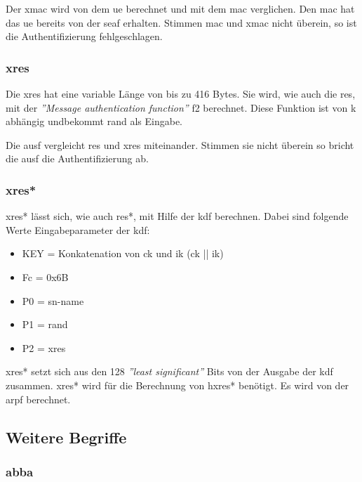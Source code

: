 Der \gls{xmac} wird von dem \gls{ue} berechnet und mit dem \gls{mac} verglichen. 
Den \gls{mac} hat das \gls{ue} bereits von der \gls{seaf} erhalten.
Stimmen \gls{mac} und \gls{xmac} nicht \"uberein, so ist die Authentifizierung fehlgeschlagen. %

\subsubsection{\gls{xres}}
Die \gls{xres} hat eine variable L\"ange von bis zu 416 Bytes. %
Sie wird, wie auch die \gls{res}, mit der \textit{''Message authentication function''} f2 berechnet. 
Diese Funktion ist von \gls{k} abh\"angig undbekommt \gls{rand} als Eingabe. %

Die \gls{ausf} vergleicht \gls{res} und \gls{xres} miteinander.
Stimmen sie nicht \"uberein so bricht die \gls{ausf} die Authentifizierung ab. %

\subsubsection{\gls{xres*}}
\gls{xres*} l\"asst sich, wie auch \gls{res*}, mit Hilfe der \gls{kdf} berechnen.
Dabei sind folgende Werte Eingabeparameter der \gls{kdf}: %
\begin{itemize}
\item KEY = Konkatenation von \gls{ck} und \gls{ik} (\gls{ck} || \gls{ik})
\item Fc = 0x6B
\item P0 = \gls{sn-name}
\item P1 = \gls{rand}
\item P2 = \gls{xres}
\end{itemize}

\gls{xres*} setzt sich aus den 128 \textit{''least significant''} Bits von der Ausgabe der \gls{kdf} zusammen.
\gls{xres*} wird f\"ur die Berechnung von \gls{hxres*} ben\"otigt.
Es wird von der \gls{arpf} berechnet.


\subsection{Weitere Begriffe}

\subsubsection{\gls{abba}}


